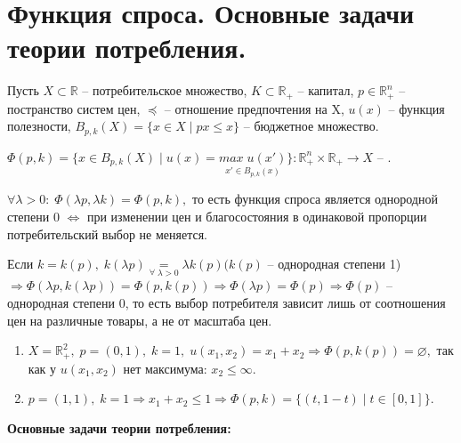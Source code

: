 \chapter{Функция спроса. Основные задачи теории потребления.}\label{cha:2}

Пусть $X \subset \mathbb{R}$ -- потребительское множество, $K \subset \mathbb{R}_+$ -- капитал, $p \in \mathbb{R}_+^n$ -- постранство систем цен, $\preceq$ -- отношение предпочтения на X, $u(x)$ -- функция полезности, $B_{p,k}(X) = \{ x \in X \mid px \leq x\}$ -- бюджетное множество. 

\begin{definition}
	$\Phi(p,k) = \{ x \in B_{p,k}(X) \mid u(x) = \underset{x' \in B_{p,k}(x)}{max \; u(x')} \}: \mathbb{R}_+^n \times \mathbb{R}_+ \rightarrow X$ -- .
\end{definition}

\begin{clair}
	$\forall \lambda > 0: \; \Phi(\lambda p, \lambda k) = \Phi(p, k),$ то есть функция спроса является однородной степени 0 $\Leftrightarrow $ при изменении цен и благосостояния в одинаковой пропорции потребительский выбор не меняется.
\end{clair}

Если $k = k(p), \; k(\lambda p) \underset{\forall \; \lambda > 0}{=} \lambda k(p)(k(p)$ -- однородная степени 1) $\Rightarrow \Phi(\lambda p, k(\lambda p)) = \Phi(p, k(p)) \Rightarrow \Phi(\lambda p) = \Phi(p) \Rightarrow \Phi(p)$ -- однородная степени 0, то есть выбор потребителя зависит лишь от соотношения цен на различные товары, а не от масштаба цен.

\begin{example}
	\begin{enumerate}
		\item $X = \mathbb{R}_+^2, \; p = (0, 1), \; k = 1, \; u(x_1, x_2) = x_1 + x_2 \Rightarrow \Phi(p, k(p)) = \varnothing,$ так как у $u(x_1, x_2)$ нет максимума: $x_2 \leq \infty$.
		\item $p = (1, 1), \; k = 1 \Rightarrow x_1 + x_2 \leq 1 \Rightarrow \Phi(p, k) = \{ (t, 1 - t) \mid t \in [0, 1]\}$.
	\end{enumerate}
\end{example}

\textbf{Основные задачи теории потребления:}

